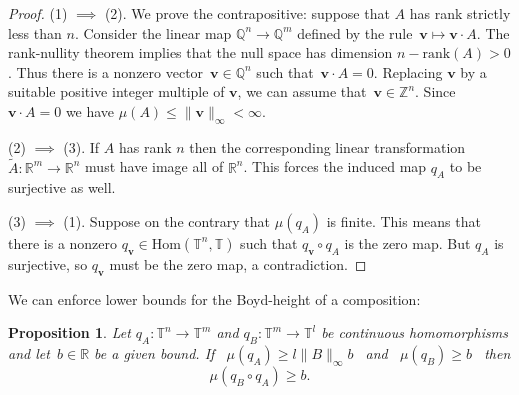 \documentclass[12pt]{amsart}
\theoremstyle{plain}
\newtheorem{proposition}[theorem]{Proposition}
\theoremstyle{definition}
\theoremstyle{remark}
\numberwithin{theorem}{section}
\numberwithin{equation}{section} %
\newcommand{\bZ}{{\mathbb{Z}}}
\newcommand{\bR}{{\mathbb{R}}}
\newcommand{\bQ}{{\mathbb{Q}}}
\newcommand{\mb}{\mathbf}
\newcommand{\torus}{{\mathbb{T}}}
\begin{document}
\begin{proof}
(1) $\implies$ (2). We prove the contrapositive: suppose that $A$ has rank strictly less than $n$. Consider the linear map $\bQ^n \to \bQ^m$
defined by the rule~$\mb v \mapsto \mb v \cdot A$. The rank-nullity theorem implies that the null space has dimension $n - \mathrm{rank} (A) > 0$. Thus there
is a nonzero vector~$\mb v \in \bQ^n$ such that~$\mb v \cdot A = 0$. Replacing $\mb v$ by a suitable positive integer multiple of $\mb v$, we can assume that~$\mb v \in \bZ^n$.
Since $\mb v \cdot A = 0$ we have $\mu(A) \le \| \mb v \|_\infty < \infty$.

(2) $\implies$ (3). If $A$ has rank $n$ then the corresponding linear transformation $\tilde A \colon \bR^m \to \bR^n$ must have image all of $\bR^n$. This forces the induced map $q_A$
to be surjective as well.

(3) $\implies$ (1).  Suppose on the contrary that $\mu(q_A)$ is finite. This means that there is a nonzero $q_{\mb v} \in\mathrm{Hom}(\torus^n, \torus)$ such that $q_{\mb v} \circ q_A$ is the zero map.
But  $q_A$ is surjective, so $q_{\mb v}$ must be the zero map, a contradiction.
\end{proof}



We can enforce lower bounds for the Boyd-height 
of a composition:


\begin{proposition}\label{TP_prop}
Let $q_{A} \colon \torus^n \to \torus^m$ and $q_{B} \colon \torus^m \to \torus^l$ be continuous homomorphisms and
let~$b \in \bR$ be a given bound.
If \ 
$\mu \left( q_{A} \right) \ge l\|B\|_\infty b$ \ 
and  \ 
$\mu \left( q_{B} \right) \ge  b$ 
\ 
then  
$$
\mu  \left( q_{B} \circ q_{ A} \right)  \ge b.
$$
\end{proposition}
\end{document}
